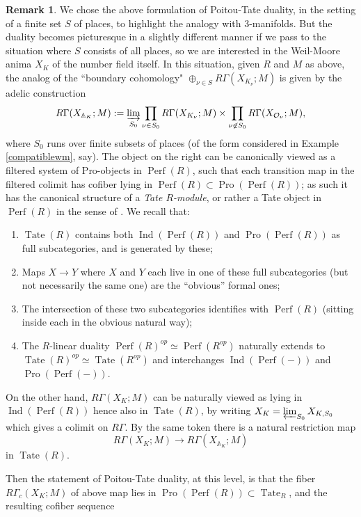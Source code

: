 \documentclass[12pt]{article}
\theoremstyle{definition}
\newtheorem{remark}[theorem]{Remark}
\newcommand{\on}{\operatorname}
\newcommand{\mc}{\mathcal}
\newcommand{\mbb}{\mathbb}
\begin{document}
\begin{remark}
We chose the above formulation of Poitou-Tate duality, in the setting of a finite set $S$ of places, to highlight the analogy with 3-manifolds.  But the duality becomes picturesque in a slightly different manner if we pass to the situation where $S$ consists of all places, so we are interested in the Weil-Moore anima $X_K$ of the number field itself.  In this situation, given $R$ and $M$ as above, the analog of the ``boundary cohomology" $\oplus_{\nu\in S}R\Gamma(X_{K_\nu};M)$ is given by the adelic construction
$$R\Gamma(X_{\mbb{A}_K};M) := \varinjlim_{S_0} \prod_{\nu\in S_0}R\Gamma(X_{K_\nu};M)\times \prod_{\nu\not\in S_0} R\Gamma(X_{\mc{O}_\nu};M),$$
where $S_0$ runs over finite subsets of places (of the form considered in Example \ref{compatiblewm}, say).  The object on the right can be canonically viewed as a filtered system of Pro-objects in $\on{Perf}(R)$, such that each transition map in the filtered colimit has cofiber lying in $\on{Perf}(R)\subset \on{Pro}(\on{Perf}(R))$; as such it has the canonical structure of a \emph{Tate $R$-module}, or rather a Tate object in $\on{Perf}(R)$ in the sense of \cite{hennion}.  We recall that:


\begin{enumerate}
\item $\on{Tate}(R)$ contains both $\on{Ind}(\on{Perf}(R))$ and $\on{Pro}(\on{Perf}(R))$ as full subcategories, and is generated by these;
\item Maps $X\to Y$ where $X$ and $Y$ each live in one of these full subcategories (but not necessarily the same one) are the ``obvious'' formal ones;
\item The intersection of these two subcategories identifies with $\on{Perf}(R)$ (sitting inside each in the obvious natural way);
\item The $R$-linear duality $\on{Perf}(R)^{op}\simeq \on{Perf}(R^{op})$ naturally extends to $\on{Tate}(R)^{op}\simeq \on{Tate}(R^{op})$ and interchanges $\on{Ind}(\on{Perf}(-))$ and $\on{Pro}(\on{Perf}(-))$.
\end{enumerate}


On the other hand, $R\Gamma(X_K;M)$ can be naturally viewed as lying in $\on{Ind}(\on{Perf}(R))$ hence also in $\on{Tate}(R)$, by writing $X_K=\varprojlim_{S_0} X_{K,S_0}$ which gives a colimit on $R\Gamma$.  By the same token there is a natural restriction map $$R\Gamma(X_K;M) \to R\Gamma(X_{\mbb{A}_K};M)$$
in $\on{Tate}(R)$.

Then the statement of Poitou-Tate duality, at this level, is that the fiber $R\Gamma_c(X_K;M)$ of above map lies in $\on{Pro}(\on{Perf}(R))\subset \on{Tate}_R$, and the resulting cofiber sequence


\end{remark}
\end{document}

